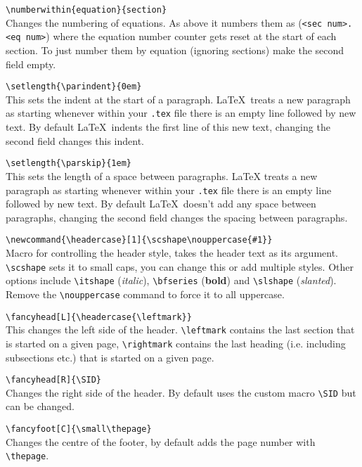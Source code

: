 \documentclass[a4paper, 12pt, english]{article}
\begin{document}
            \verb+\numberwithin{equation}{section}+\\
            Changes the numbering of equations. As above it numbers them as (\verb+<sec num>.<eq num>+) where the equation number counter gets reset at the start of each section. To just number them by equation (ignoring sections) make the second field empty.

            \verb+\setlength{\parindent}{0em}+\\
            This sets the indent at the start of a paragraph. \LaTeX~treats a new paragraph as starting whenever within your \verb+.tex+ file there is an empty line followed by new text. By default \LaTeX~indents the first line of this new text, changing the second field changes this indent.

            \verb+\setlength{\parskip}{1em}+\\
            This sets the length of a space between paragraphs. LaTeX treats a new paragraph as starting whenever within your \verb+.tex+ file there is an empty line followed by new text. By default \LaTeX~doesn't add any space between paragraphs, changing the second field changes the spacing between paragraphs.

            \verb+\newcommand{\headercase}[1]{\scshape\nouppercase{#1}}+\\
            Macro for controlling the header style, takes the header text as its argument. \verb+\scshape+ sets it to small caps, you can change this or add multiple styles. Other options include \verb+\itshape+ ({\itshape italic}), \verb+\bfseries+ ({\bfseries bold}) and \verb+\slshape+ ({\slshape slanted}).\\
            Remove the \verb+\nouppercase+ command to force it to all uppercase.

            \verb+\fancyhead[L]{\headercase{\leftmark}}+\\
            This changes the left side of the header. \verb+\leftmark+ contains the last section that is started on a given page, \verb+\rightmark+ contains the last heading (i.e. including subsections etc.) that is started on a given page.

            \verb+\fancyhead[R]{\SID}+\\
            Changes the right side of the header. By default uses the custom macro \verb+\SID+ but can be changed.

            \verb+\fancyfoot[C]{\small\thepage}+\\
            Changes the centre of the footer, by default adds the page number with \verb+\thepage+.
\end{document}
